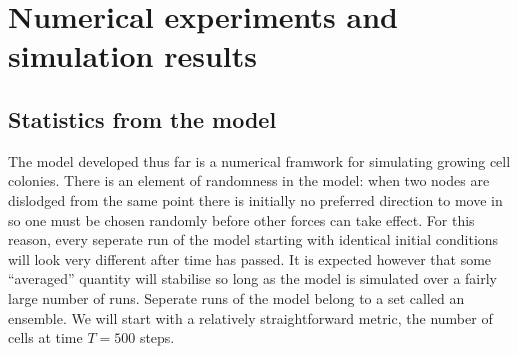 \chapter{Numerical experiments and simulation results}

\section{Statistics from the model}
The model developed thus far is a numerical framwork for simulating growing cell colonies.
There is an element of randomness in the model: when two nodes are dislodged from the 
same point there is initially no preferred direction to move in so one must be chosen randomly
before other forces can take effect. For this reason, every seperate run of the model 
starting with identical initial conditions will look very different after time has passed. 
It is expected however that some ``averaged''
quantity will stabilise so long as the model is simulated over a fairly large number of runs.
Seperate runs of the model belong to a set called an ensemble.
We will start with a relatively straightforward metric, the number of cells at time
$T = 500$ steps.
\\

